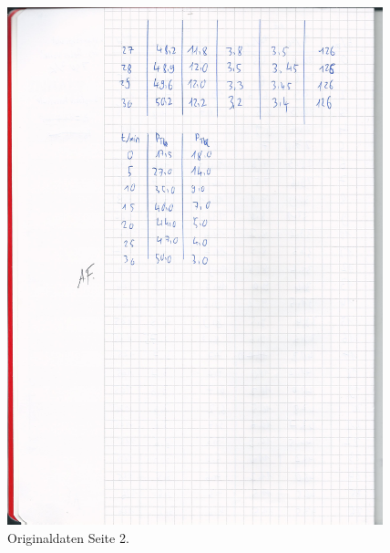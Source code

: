 \begin{figure}
  \centering
  \includegraphics[height=15.0cm]{original_v206_2.jpg}
  \caption{Originaldaten Seite 2.}
  \label{fig:o2}
\end{figure}
\printbibliography



